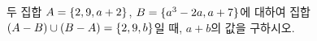 두 집합 $A=\{2{,}\mkern3mu\mathopen{}9{,}\mkern3mu\mathopen{}a+2\}$, $B=\{a^3-2a{,}\mkern3mu\mathopen{}a+7\}$에 대하여 집합 $(A-B)\cup(B-A)=\{2{,}\mkern3mu\mathopen{}9{,}\mkern3mu\mathopen{}b\}$일 때, $a+b$의 값을 구하시오. 
